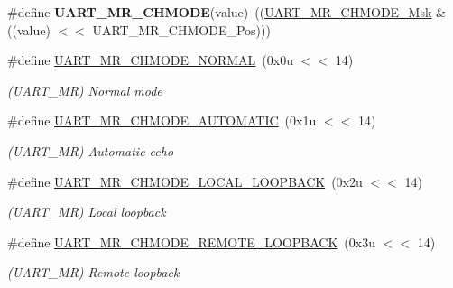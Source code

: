 \begin{DoxyCompactItemize}
\mbox{\label{group__SAMS70__UART_gab5b8bfa6c86afa2918bdc585823ae86f}} 
\#define {\bfseries U\+A\+R\+T\+\_\+\+M\+R\+\_\+\+C\+H\+M\+O\+DE}(value)~((\mbox{\hyperlink{group__SAMV71__UART_gaae4c24ca9b88ad0fcc45c6525705d23c}{U\+A\+R\+T\+\_\+\+M\+R\+\_\+\+C\+H\+M\+O\+D\+E\+\_\+\+Msk}} \& ((value) $<$$<$ U\+A\+R\+T\+\_\+\+M\+R\+\_\+\+C\+H\+M\+O\+D\+E\+\_\+\+Pos)))
\item 
\mbox{\label{group__SAMS70__UART_ga2761793c6a7ac89444965deb9147b9c7}} 
\#define \mbox{\hyperlink{group__SAMS70__UART_ga2761793c6a7ac89444965deb9147b9c7}{U\+A\+R\+T\+\_\+\+M\+R\+\_\+\+C\+H\+M\+O\+D\+E\+\_\+\+N\+O\+R\+M\+AL}}~(0x0u $<$$<$ 14)
\begin{DoxyCompactList}\small\item\em (U\+A\+R\+T\+\_\+\+MR) Normal mode \end{DoxyCompactList}\item 
\mbox{\label{group__SAMS70__UART_ga3e7e86c1dbd250fe7a0edd0a0bf712d1}} 
\#define \mbox{\hyperlink{group__SAMS70__UART_ga3e7e86c1dbd250fe7a0edd0a0bf712d1}{U\+A\+R\+T\+\_\+\+M\+R\+\_\+\+C\+H\+M\+O\+D\+E\+\_\+\+A\+U\+T\+O\+M\+A\+T\+IC}}~(0x1u $<$$<$ 14)
\begin{DoxyCompactList}\small\item\em (U\+A\+R\+T\+\_\+\+MR) Automatic echo \end{DoxyCompactList}\item 
\mbox{\label{group__SAMS70__UART_gaccdee7be5b1c4193e9b5db7a4470af3d}} 
\#define \mbox{\hyperlink{group__SAMS70__UART_gaccdee7be5b1c4193e9b5db7a4470af3d}{U\+A\+R\+T\+\_\+\+M\+R\+\_\+\+C\+H\+M\+O\+D\+E\+\_\+\+L\+O\+C\+A\+L\+\_\+\+L\+O\+O\+P\+B\+A\+CK}}~(0x2u $<$$<$ 14)
\begin{DoxyCompactList}\small\item\em (U\+A\+R\+T\+\_\+\+MR) Local loopback \end{DoxyCompactList}\item 
\mbox{\label{group__SAMS70__UART_ga8418adfee235ea37e74a0d9222724c13}} 
\#define \mbox{\hyperlink{group__SAMS70__UART_ga8418adfee235ea37e74a0d9222724c13}{U\+A\+R\+T\+\_\+\+M\+R\+\_\+\+C\+H\+M\+O\+D\+E\+\_\+\+R\+E\+M\+O\+T\+E\+\_\+\+L\+O\+O\+P\+B\+A\+CK}}~(0x3u $<$$<$ 14)
\begin{DoxyCompactList}\small\item\em (U\+A\+R\+T\+\_\+\+MR) Remote loopback \end{DoxyCompactList}\item 
$$
\end{DoxyCompactItemize}
